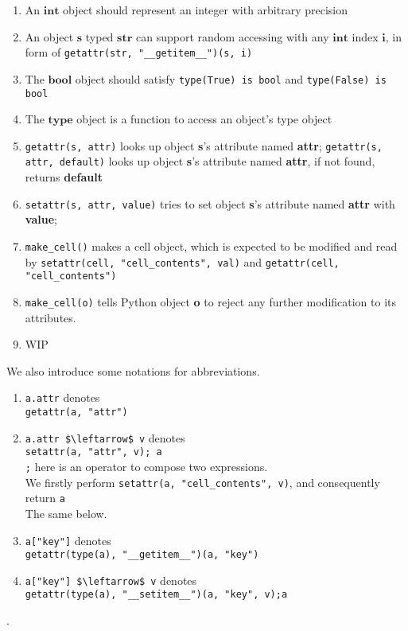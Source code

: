 \documentclass[12pt, a4paper]{report}
\begin{document}
\begin{enumerate}
\item An $\mathbf{int}$ object should represent an integer with arbitrary precision
\item An object $\mathbf{s}$ typed $\mathbf{str}$
can support random accessing with any $\mathbf{int}$ index $\mathbf{i}$,
in form of \lstinline!getattr(str, "__getitem__")(s, i)!
\item The $\mathbf{bool}$ object should satisfy \lstinline!type(True) is bool! and \lstinline!type(False) is bool!
\item The $\mathbf{type}$ object is a function to access an object's type object
\item \lstinline!getattr(s, attr)! looks up object \textbf{s}'s attribute named \textbf{attr};
      \lstinline!getattr(s, attr, default)! looks up object \textbf{s}'s attribute named \textbf{attr},
      if not found, returns \textbf{default}
\item \lstinline!setattr(s, attr, value)! tries to set object \textbf{s}'s attribute named \textbf{attr} with \textbf{value};
\item \lstinline!make_cell()! makes a cell object,
      which is expected to be modified and read by
      \lstinline!setattr(cell, "cell_contents", val)!
      and \lstinline!getattr(cell, "cell_contents")!
\item \lstinline!make_cell(o)! tells Python object \textbf{o} to reject any further modification to its attributes.
\item WIP
\end{enumerate}

We also introduce some notations for abbreviations.

\begin{enumerate}
\item \lstinline!a.attr! denotes \vbox{} \\
     \lstinline!getattr(a, "attr")!
\item \lstinline!a.attr $\leftarrow$ v! denotes \vbox{} \\
     \lstinline!setattr(a, "attr", v); a! \\
    \lstinline!;! here is an operator to compose two expressions. \\
    We firstly perform \lstinline!setattr(a, "cell_contents", v)!, and consequently return \lstinline!a! \\
    The same below.
\item \lstinline!a["key"]! denotes \vbox{} \\
    \lstinline!getattr(type(a), "__getitem__")(a, "key")!
\item \lstinline!a["key"] $\leftarrow$ v! denotes \vbox{} \\
     \lstinline!getattr(type(a), "__setitem__")(a, "key", v);a!
\end{enumerate}.
\end{document}
